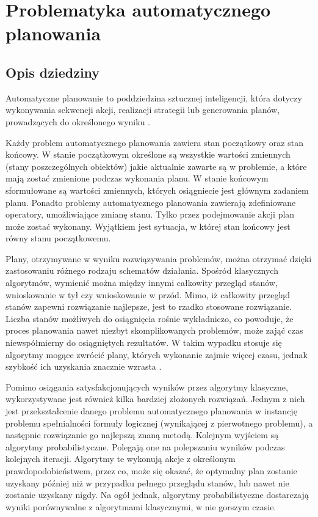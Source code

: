 \chapter{Problematyka automatycznego planowania}
 \section{Opis dziedziny}
 \label{sec:opis}
Automatyczne planowanie to poddziedzina sztucznej inteligencji, która dotyczy wykonywania sekwencji akcji, realizacji strategii lub generowania planów, prowadzących do określonego wyniku \cite{planning}.

Każdy problem automatycznego planowania zawiera stan początkowy oraz stan końcowy. W stanie początkowym określone są wszystkie wartości zmiennych (stany poszczególnych obiektów) jakie aktualnie zawarte są w problemie, a które mają zostać zmienione podczas wykonania planu. W stanie końcowym sformułowane są wartości zmiennych, których osiągniecie jest głównym zadaniem planu. Ponadto problemy automatycznego planowania zawierają zdefiniowane operatory, umożliwiające zmianę stanu. Tylko przez podejmowanie akcji plan może zostać wykonany. Wyjątkiem jest sytuacja, w której stan końcowy jest równy stanu początkowemu.

Plany, otrzymywane w wyniku rozwiązywania problemów, można otrzymać dzięki zastosowaniu różnego rodzaju schematów działania. Spośród klasycznych algorytmów, wymienić można między innymi całkowity przegląd stanów, wnioskowanie w tył czy wnioskowanie w przód. Mimo, iż całkowity przegląd stanów zapewni rozwiązanie najlepsze, jest to rzadko stosowane rozwiązanie. Liczba stanów możliwych do osiągnięcia rośnie wykładniczo, co powoduje, że proces planowania nawet niezbyt skomplikowanych problemów, może zająć czas niewspółmierny do osiągniętych rezultatów. W takim wypadku stosuje się algorytmy mogące zwrócić plany, których wykonanie zajmie więcej czasu, jednak szybkość ich uzyskania znacznie wzrasta \cite{fdalgorytm}.

Pomimo osiągania satysfakcjonujących wyników przez algorytmy klasyczne, wykorzystywane jest również kilka bardziej złożonych rozwiązań. Jednym z nich jest przekształcenie danego problemu automatycznego planowania w instancję problemu spełnialności formuły logicznej (wynikającej z pierwotnego problemu), a następnie  rozwiązanie go najlepszą znaną metodą. Kolejnym wyjściem są algorytmy probabilistyczne. Polegają one na polepszaniu wyników podczas kolejnych iteracji. Algorytmy te wykonują akcje z określonym prawdopodobieństwem, przez co, może się okazać, że optymalny plan zostanie uzyskany później niż w przypadku pełnego przeglądu stanów, lub nawet nie zostanie uzyskany nigdy. Na ogół jednak, algorytmy probabilistyczne dostarczają wyniki porównywalne z algorytmami klasycznymi, w nie gorszym czasie.

